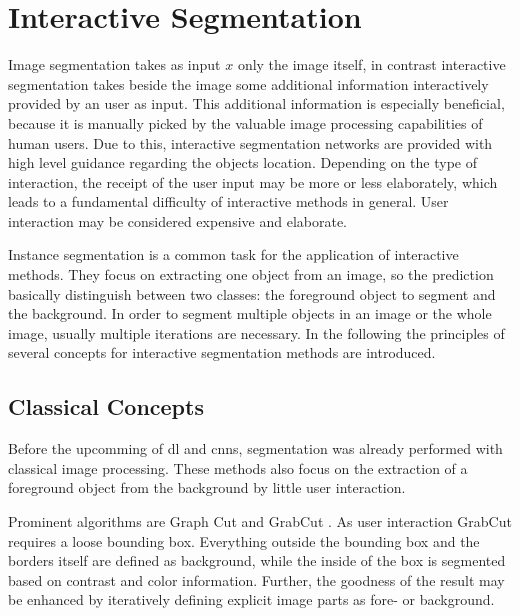 
\section{Interactive Segmentation}\label{ord:ch2:sec3}

Image segmentation takes as input $x$ only the image itself, in contrast interactive segmentation takes beside the image some additional information interactively provided by an user as input.
This additional information is especially beneficial, because it is manually picked by the valuable image processing capabilities of human users.
Due to this, interactive segmentation networks are provided with high level guidance regarding the objects location.
Depending on the type of interaction, the receipt of the user input may be more or less elaborately, which leads to a fundamental difficulty of interactive methods in general.
User interaction may be considered expensive and elaborate.

Instance segmentation is a common task for the application of interactive methods.
They focus on extracting one object from an image, so the prediction basically distinguish between two classes: the foreground object to segment and the background.
In order to segment multiple objects in an image or the whole image, usually multiple iterations are necessary.
In the following the principles of several concepts for interactive segmentation methods are introduced.

\subsection{Classical Concepts}\label{ord:ch2:sec3:subsec1}
Before the upcomming of \gls{dl} and \glspl{cnn}, segmentation was already performed with classical image processing.
These methods also focus on the extraction of a foreground object from the background by little user interaction.

Prominent algorithms are Graph Cut \cite{BJ01-GraphCut} and GrabCut \cite{RKB04-GrabCut}.
As user interaction GrabCut requires a loose bounding box.
Everything outside the bounding box and the borders itself are defined as background, while the inside of the box is segmented based on contrast and color information.
Further, the goodness of the result may be enhanced by iteratively defining explicit image parts as fore- or background.

